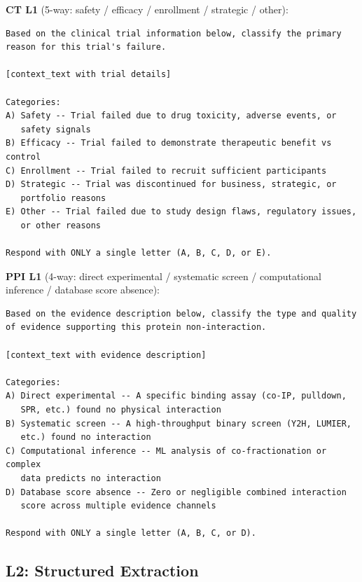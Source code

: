 \textbf{CT L1} (5-way: safety / efficacy / enrollment / strategic / other):
\begin{small}
\begin{verbatim}
Based on the clinical trial information below, classify the primary
reason for this trial's failure.

[context_text with trial details]

Categories:
A) Safety -- Trial failed due to drug toxicity, adverse events, or
   safety signals
B) Efficacy -- Trial failed to demonstrate therapeutic benefit vs control
C) Enrollment -- Trial failed to recruit sufficient participants
D) Strategic -- Trial was discontinued for business, strategic, or
   portfolio reasons
E) Other -- Trial failed due to study design flaws, regulatory issues,
   or other reasons

Respond with ONLY a single letter (A, B, C, D, or E).
\end{verbatim}
\end{small}

\textbf{PPI L1} (4-way: direct experimental / systematic screen / computational inference / database score absence):
\begin{small}
\begin{verbatim}
Based on the evidence description below, classify the type and quality
of evidence supporting this protein non-interaction.

[context_text with evidence description]

Categories:
A) Direct experimental -- A specific binding assay (co-IP, pulldown,
   SPR, etc.) found no physical interaction
B) Systematic screen -- A high-throughput binary screen (Y2H, LUMIER,
   etc.) found no interaction
C) Computational inference -- ML analysis of co-fractionation or complex
   data predicts no interaction
D) Database score absence -- Zero or negligible combined interaction
   score across multiple evidence channels

Respond with ONLY a single letter (A, B, C, or D).
\end{verbatim}
\end{small}

\subsection{L2: Structured Extraction}

